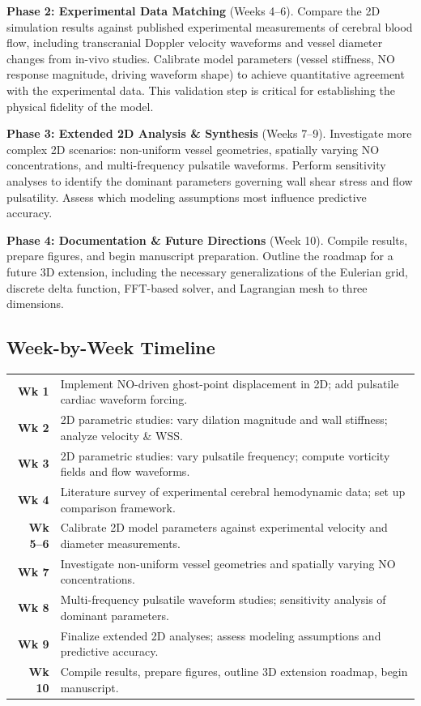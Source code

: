 \documentclass[12pt]{article}
\begin{document}
\textbf{Phase 2: Experimental Data Matching} (Weeks 4--6). Compare the 2D simulation results against published experimental measurements of cerebral blood flow, including transcranial Doppler velocity waveforms and vessel diameter changes from in-vivo studies. Calibrate model parameters (vessel stiffness, NO response magnitude, driving waveform shape) to achieve quantitative agreement with the experimental data. This validation step is critical for establishing the physical fidelity of the model.

\textbf{Phase 3: Extended 2D Analysis \& Synthesis} (Weeks 7--9). Investigate more complex 2D scenarios: non-uniform vessel geometries, spatially varying NO concentrations, and multi-frequency pulsatile waveforms. Perform sensitivity analyses to identify the dominant parameters governing wall shear stress and flow pulsatility. Assess which modeling assumptions most influence predictive accuracy.

\textbf{Phase 4: Documentation \& Future Directions} (Week 10). Compile results, prepare figures, and begin manuscript preparation. Outline the roadmap for a future 3D extension, including the necessary generalizations of the Eulerian grid, discrete delta function, FFT-based solver, and Lagrangian mesh to three dimensions.

\subsection*{Week-by-Week Timeline}

{\small
\begin{tabular}{r p{12.5cm}}
    \textbf{Wk 1} & Implement NO-driven ghost-point displacement in 2D; add pulsatile cardiac waveform forcing. \\
    \textbf{Wk 2} & 2D parametric studies: vary dilation magnitude and wall stiffness; analyze velocity \& WSS. \\
    \textbf{Wk 3} & 2D parametric studies: vary pulsatile frequency; compute vorticity fields and flow waveforms. \\
    \textbf{Wk 4} & Literature survey of experimental cerebral hemodynamic data; set up comparison framework. \\
    \textbf{Wk 5--6} & Calibrate 2D model parameters against experimental velocity and diameter measurements. \\
    \textbf{Wk 7} & Investigate non-uniform vessel geometries and spatially varying NO concentrations. \\
    \textbf{Wk 8} & Multi-frequency pulsatile waveform studies; sensitivity analysis of dominant parameters. \\
    \textbf{Wk 9} & Finalize extended 2D analyses; assess modeling assumptions and predictive accuracy. \\
    \textbf{Wk 10} & Compile results, prepare figures, outline 3D extension roadmap, begin manuscript. \\
\end{tabular}
}
\end{document}

